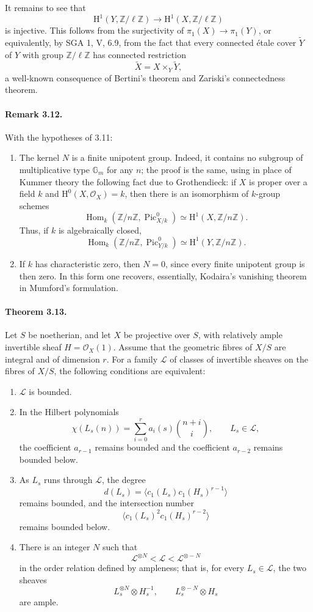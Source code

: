 \documentclass[12pt]{article}
\newcommand{\ZZ}{\mathbb Z}
\newcommand{\Gm}{\mathbb G_m}
\newcommand{\cO}{\mathcal O}
\newcommand{\cL}{\mathcal L}
\newcommand{\Pic}{\operatorname{Pic}}
\newcommand{\Hom}{\operatorname{Hom}}
\newcommand{\HH}{\mathrm H}
\newcommand{\longto}{\longrightarrow}
\begin{document}
It remains to see that
\[
\HH^1(Y,\ZZ/\ell\ZZ)\longto\HH^1(X,\ZZ/\ell\ZZ)
\]
is injective. This follows from the surjectivity of $\pi_1(X)\to\pi_1(Y)$, or equivalently, by SGA 1, V, 6.9, from the fact that every connected étale cover $\widetilde Y$ of $Y$ with group $\ZZ/\ell\ZZ$ has connected restriction
\[
\widetilde X=X\times_Y\widetilde Y,
\]
a well-known consequence of Bertini's theorem and Zariski's connectedness theorem.

\paragraph{Remark 3.12.}
With the hypotheses of 3.11:
\begin{enumerate}[label=\roman*)]
\item The kernel $N$ is a finite unipotent group. Indeed, it contains no subgroup of multiplicative type $\Gm$ for any $n$; the proof is the same, using in place of Kummer theory the following fact due to Grothendieck: if $X$ is proper over a field $k$ and $\HH^0(X,\cO_X)=k$, then there is an isomorphism of $k$-group schemes
\[
\Hom_k(\ZZ/n\ZZ,\Pic^0_{X/k})\simeq \HH^1(X,\ZZ/n\ZZ).
\]
Thus, if $k$ is algebraically closed,
\[
\Hom_k(\ZZ/n\ZZ,\Pic^0_{Y/k})\simeq \HH^1(Y,\ZZ/n\ZZ).
\]
\item If $k$ has characteristic zero, then $N=0$, since every finite unipotent group is then zero. In this form one recovers, essentially, Kodaira's vanishing theorem in Mumford's formulation.
\end{enumerate}

\paragraph{Theorem 3.13.}
Let $S$ be noetherian, and let $X$ be projective over $S$, with relatively ample invertible sheaf $H=\cO_X(1)$. Assume that the geometric fibres of $X/S$ are integral and of dimension $r$. For a family $\cL$ of classes of invertible sheaves on the fibres of $X/S$, the following conditions are equivalent:
\begin{enumerate}[label=\roman*)]
\item $\cL$ is bounded.
\item In the Hilbert polynomials
\[
\chi(L_s(n))=\sum_{i=0}^r a_i(s)\binom{n+i}{i},\qquad L_s\in\cL,
\]
the coefficient $a_{r-1}$ remains bounded and the coefficient $a_{r-2}$ remains bounded below.
\item As $L_s$ runs through $\cL$, the degree
\[
d(L_s)=\langle c_1(L_s)c_1(H_s)^{r-1}\rangle
\]
remains bounded, and the intersection number
\[
\langle c_1(L_s)^2c_1(H_s)^{r-2}\rangle
\]
remains bounded below.
\item There is an integer $N$ such that
\[
\cL^{\otimes N}<\cL<\cL^{\otimes -N}
\]
in the order relation defined by ampleness; that is, for every $L_s\in\cL$, the two sheaves
\[
L_s^{\otimes N}\otimes H_s^{-1},\qquad L_s^{\otimes -N}\otimes H_s
\]
are ample.
\end{enumerate}
\end{document}
